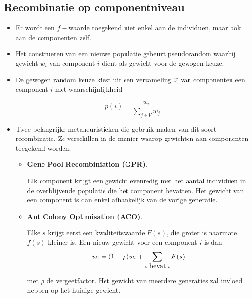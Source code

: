 \subsection{Recombinatie op componentniveau}
\begin{itemize}

    \item Er wordt een $f-$waarde toegekend niet enkel aan de individuen, maar ook aan de componenten zelf.
    \item Het construeren van een nieuwe populatie gebeurt pseudorandom waarbij gewicht $w_i$ van component $i$ dient als gewicht voor de gewogen keuze.
    \item De gewogen random keuze kiest uit een verzameling $\mathcal{V}$ van componenten een component $i$ met waarschijnlijkheid

    $$p(i) = \frac{w_i}{\sum_{j \in V}w_j}$$

    \item Twee belangrijke metaheuristieken die gebruik maken van dit soort recombinatie. Ze verschillen in de manier waarop gewichten aan componenten toegekend worden.
    \begin{itemize}
        \item \textbf{Gene Pool Recombiniation (GPR)}.
        
        Elk component krijgt een gewicht evenredig met het aantal individuen in de overblijvende populatie die het component bevatten. Het gewicht van een component is dan enkel afhankelijk van de vorige generatie.
        \item \textbf{Ant Colony Optimisation (ACO)}.

        Elke $s$ krijgt eerst een kwaliteitswaarde $F(s)$, die groter is naarmate $f(s)$ kleiner is. Een nieuw gewicht voor een component $i$ is dan
        $$w_i = (1 - \rho)w_i + \sum_{s\hbox{ bevat } i} F(s)$$

        met $\rho$ de vergeetfactor. Het gewicht van meerdere generaties zal invloed hebben op het huidige gewicht.

        
    \end{itemize}
\end{itemize}

